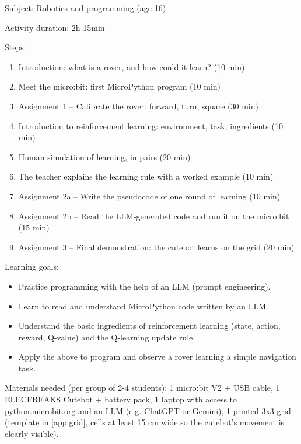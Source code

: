 \documentclass[12pt]{article}
\begin{document}
\vspace*{0.25\textheight}

Subject: Robotics and programming (age 16)

\vspace{0.3cm}

Activity duration: 2h 15min

\vspace{0.5cm}

Steps:
\begin{enumerate}
    \item Introduction: what is a rover, and how could it learn? (10 min)
    \item Meet the micro:bit: first MicroPython program (10 min)
    \item Assignment 1 -- Calibrate the rover: forward, turn, square (30 min)
    \item Introduction to reinforcement learning: environment, task, ingredients (10 min)
    \item Human simulation of learning, in pairs (20 min)
    \item The teacher explains the learning rule with a worked example (10 min)
    \item Assignment 2a -- Write the pseudocode of one round of learning (10 min)
    \item Assignment 2b -- Read the LLM-generated code and run it on the micro:bit (15 min)
    \item Assignment 3 -- Final demonstration: the cutebot learns on the grid (20 min)
\end{enumerate}

Learning goals:

\begin{itemize}
    \item Practice programming with the help of an LLM (prompt engineering).
    \item Learn to read and understand MicroPython code written by an LLM.
    \item Understand the basic ingredients of reinforcement learning (state, action, reward, Q-value) and the Q-learning update rule.
    \item Apply the above to program and observe a rover learning a simple navigation task.
\end{itemize}

Materials needed (per group of 2-4 students): 1 micro:bit V2 + USB cable, 1 ELECFREAKS Cutebot + battery pack, 1 laptop with access to \url{python.microbit.org} and an LLM (e.g. ChatGPT or Gemini), 1 printed 3x3 grid (template in \cref{app:grid}, cells at least 15 cm wide so the cutebot's movement is clearly visible).
\end{document}
